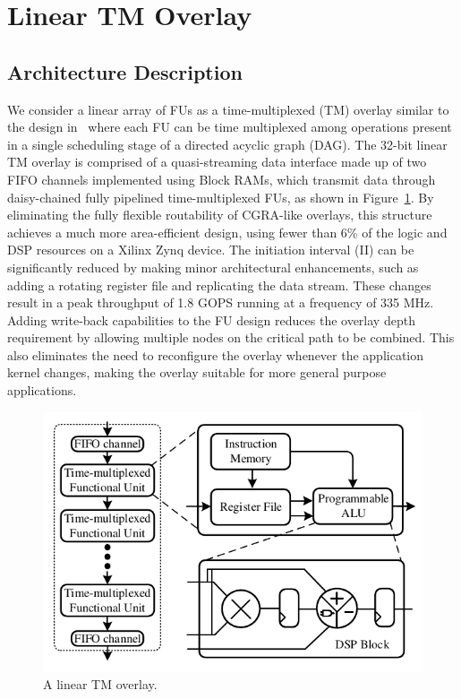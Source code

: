 \section{Linear TM Overlay}

\subsection{Architecture Description}
We consider a linear array of FUs as a time-multiplexed (TM) overlay similar to the design in~\cite{li2018time} where each FU can be time multiplexed among operations present in a single scheduling stage of a directed acyclic graph (DAG). 
The 32-bit linear TM overlay is comprised of a quasi-streaming data interface made up of two FIFO channels implemented using Block RAMs, which transmit data through daisy-chained fully pipelined time-multiplexed FUs, as shown in Figure~\ref{overlay}. 
By eliminating the fully flexible routability of CGRA-like overlays, this structure achieves a much more area-efficient design, using fewer than 6\% of the logic and DSP resources on a Xilinx Zynq device. 
The initiation interval (II) can be significantly reduced by making minor architectural enhancements, such as adding a rotating register file and replicating the data stream. 
These changes result in a peak throughput of 1.8 GOPS running at a frequency of 335 MHz. %
Adding write-back capabilities to the FU design reduces the overlay depth requirement by allowing multiple nodes on the critical path to be combined. 
This also eliminates the need to reconfigure the overlay whenever the application kernel changes, making the overlay suitable for more general purpose applications. 


\begin{figure}
    \centering
	\includegraphics[width=\columnwidth]{Figures/overlay.pdf}
	\caption{A linear TM overlay.}
	\label{overlay}
\end{figure}


